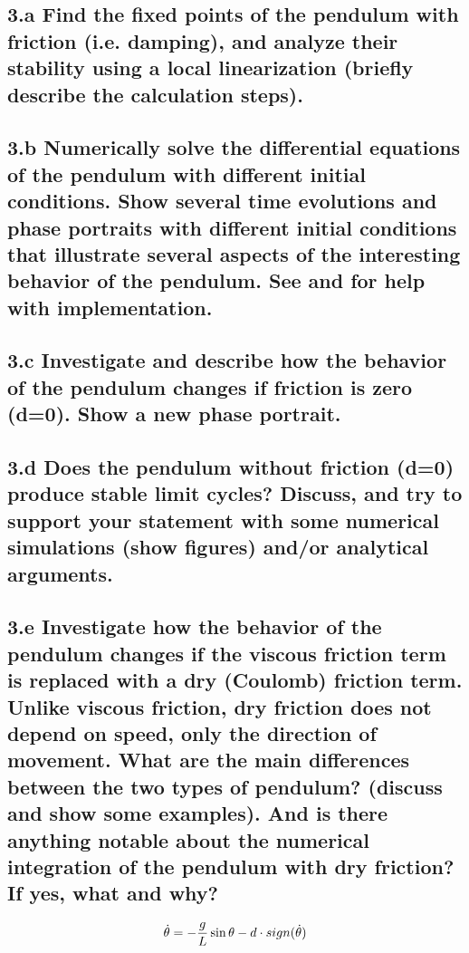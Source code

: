 \documentclass{cmc}
\begin{document}
\subsection*{3.a Find the fixed points of the pendulum with friction
  (i.e. damping), and analyze their stability using a local linearization
  (briefly describe the calculation steps). }


\subsection*{3.b Numerically solve the differential equations of the pendulum
  with different initial conditions.  Show several time evolutions and phase
  portraits with different initial conditions that illustrate several aspects of
  the interesting behavior of the pendulum. See  and
   for help with implementation.}


\subsection*{3.c Investigate and describe how the behavior of the pendulum
  changes if friction is zero (d=0).  Show a new phase portrait.}


\subsection*{3.d Does the pendulum without friction (d=0) produce stable limit
  cycles? Discuss, and try to support your statement with some numerical
  simulations (show figures) and/or analytical arguments.}


\subsection*{3.e Investigate how the behavior of the pendulum changes if the
  viscous friction term is replaced with a dry (Coulomb) friction term. Unlike
  viscous friction, dry friction does not depend on speed, only the direction of
  movement. What are the main differences between the two types of pendulum?
  (discuss and show some examples). And is there anything notable about the
  numerical integration of the pendulum with dry friction? If yes, what and why?}

\begin{equation}
  \label{eq:ode-pendulum-dry}
  \dot{\theta} = - {g \over L} \sin \theta - d \cdot sign(\dot{\theta})
\end{equation}
\end{document}
